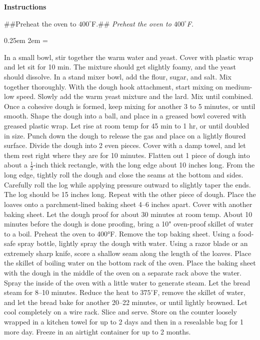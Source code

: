 \documentclass{article}
\newcommand{\temp}[1]{%
    $#1^\circ$F}
\newcommand{\showit}[3][1in]{%
    \begin{center}
        \bigskip
            \texttt{[image: \#2]}%
            \par
            \medskip
            \testoneline{#3}%
            \par
    \end{center}%
}
\newcounter{stepnum}
\newenvironment{method}[1][]{%
    \setcounter{stepnum}{0}
    \noindent
    {\color{red}\Large\textbf{Instructions}}%
    \par
    \smallskip
    \if###1##%
    \else
        \noindent
        \emph{#1}
        \par
    \fi
    \begingroup
    \parindent0pt
    \parskip0.25em
        \leftskip2em
    \everypar={\llap{\stepcounter{stepnum}\hbox to2em{\thestepnum.\hfill}}}
}{%
    \par
    \endgroup
    }
\begin{document}
\begin{method}[Preheat the oven to \temp{400}.]
    In a small bowl, stir together the warm water and yeast. Cover with plastic wrap and let sit for 10 min. The mixture should get slightly foamy, and the yeast should dissolve.
    In a stand mixer bowl, add the flour, sugar, and salt. Mix together thoroughly. With the dough hook attachment, start mixing on medium-low speed. Slowly add the warm yeast mixture and the lard. Mix until combined. Once a cohesive dough is formed, keep mixing for another 3 to 5 minutes, or until smooth.
    Shape the dough into a ball, and place in a greased bowl covered with greased plastic wrap. Let rise at room temp for 45 min to 1 hr, or until doubled in size.
    Punch down the dough to release the gas and place on a lightly floured surface. Divide the dough into 2 even pieces. Cover with a damp towel, and let them rest right where they are for 10 minutes.
    Flatten out 1 piece of dough into about a $\frac{1}{2}$-inch thick rectangle, with the long edge about 10 inches long. From the long edge, tightly roll the dough and close the seams at the bottom and sides.
    Carefully roll the log while applying pressure outward to slightly taper the ends. The log should be 15 inches long. Repeat with the other piece of dough.
    Place the loaves onto a parchment-lined baking sheet 4--6 inches apart. Cover with another baking sheet. Let the dough proof for about 30 minutes at room temp.
    About 10 minutes before the dough is done proofing, bring a 10" oven-proof skillet of water to a boil. Preheat the oven to 400°F. Remove the top baking sheet. Using a food-safe spray bottle, lightly spray the dough with water. Using a razor blade or an extremely sharp knife, score a shallow seam along the length of the loaves.
    Place the skillet of boiling water on the bottom rack of the oven. Place the baking sheet with the dough in the middle of the oven on a separate rack above the water. Spray the inside of the oven with a little water to generate steam.
    Let the bread steam for 8--10 minutes. Reduce the heat to \temp{375}, remove the skillet of water, and let the bread bake for another 20--22 minutes, or until lightly browned.
    Let cool completely on a wire rack. Slice and serve. Store on the counter loosely wrapped in a kitchen towel for up to 2 days and then in a resealable bag for 1 more day. Freeze in an airtight container for up to 2 months.
\end{method}
\end{document}
